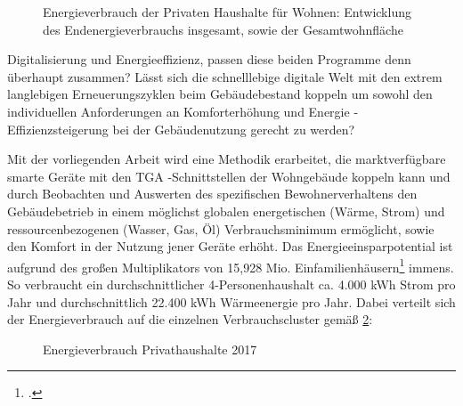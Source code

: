 \begin{figure}[htbp]
    \centering
    \caption{\label{fig-energy}Energieverbrauch der Privaten Haushalte für Wohnen: Entwicklung des Endenergieverbrauchs insgesamt, sowie der Gesamtwohnfläche}
\end{figure}

Digitalisierung und Energieeffizienz, passen diese beiden Programme denn überhaupt zusammen? Lässt sich die schnelllebige digitale Welt mit den extrem langlebigen Erneuerungszyklen beim Gebäudebestand koppeln um sowohl den individuellen Anforderungen an Komforterhöhung und Energie -Effizienzsteigerung bei der Gebäudenutzung gerecht zu werden?

Mit der vorliegenden Arbeit wird eine Methodik erarbeitet, die marktverfügbare smarte Geräte mit den \gls{TGA} -Schnittstellen der Wohngebäude koppeln kann und durch Beobachten und Auswerten des spezifischen Bewohnerverhaltens den Gebäudebetrieb in einem möglichst globalen energetischen (Wärme, Strom) und ressourcenbezogenen (Wasser, Gas, Öl) Verbrauchsminimum ermöglicht, sowie den Komfort in der Nutzung jener Geräte erhöht.  
Das Energieeinsparpotential ist aufgrund des großen Multiplikators von 15,928 Mio. Einfamilienhäusern\footcite{statistica2020} immens. So verbraucht ein durchschnittlicher 4-Personenhaushalt ca. 4.000 kWh Strom pro Jahr und durchschnittlich 22.400 kWh Wärmeenergie pro Jahr. Dabei verteilt sich der Energieverbrauch auf die einzelnen Verbrauchscluster gemäß \cref{fig:energieverbrauch}:

\begin{figure}[htbp]
    \centering
    \caption{\label{fig:energieverbrauch}Energieverbrauch Privathaushalte 2017}
\end{figure}